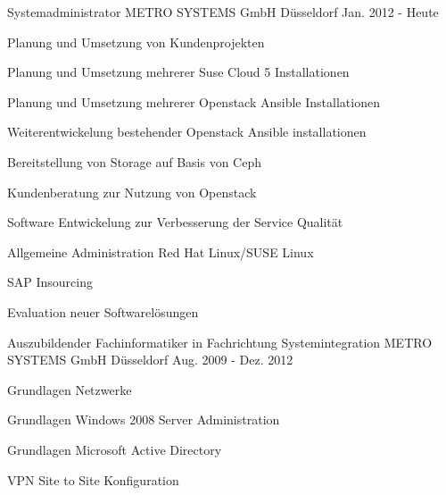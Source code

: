 

\begin{cventries}

  \cventry
    {Systemadministrator} %
    {METRO SYSTEMS GmbH} %
    {Düsseldorf} %
    {Jan. 2012 - Heute} %
    {
      \begin{cvitems} %
        \item {Planung und Umsetzung von Kundenprojekten}
        \item {Planung und Umsetzung mehrerer Suse Cloud 5 Installationen}
        \item {Planung und Umsetzung mehrerer Openstack Ansible Installationen}
        \item {Weiterentwickelung bestehender Openstack Ansible installationen}
        \item {Bereitstellung von Storage auf Basis von Ceph}
        \item {Kundenberatung zur Nutzung von Openstack}
        \item {Software Entwickelung zur Verbesserung der Service Qualität}
        \item {Allgemeine Administration Red Hat Linux/SUSE Linux}
        \item {SAP Insourcing}
        \item {Evaluation neuer Softwarelösungen}
      \end{cvitems}
    }

  \cventry
    {Auszubildender Fachinformatiker in Fachrichtung Systemintegration} %
    {METRO SYSTEMS GmbH} %
    {Düsseldorf} %
    {Aug. 2009 - Dez. 2012} %
    {
      \begin{cvitems} %
        \item {Grundlagen Netzwerke}
        \item {Grundlagen Windows 2008 Server Administration}
        \item {Grundlagen Microsoft Active Directory}
        \item {VPN Site to Site Konfiguration}
      \end{cvitems}
    }


\end{cventries}
